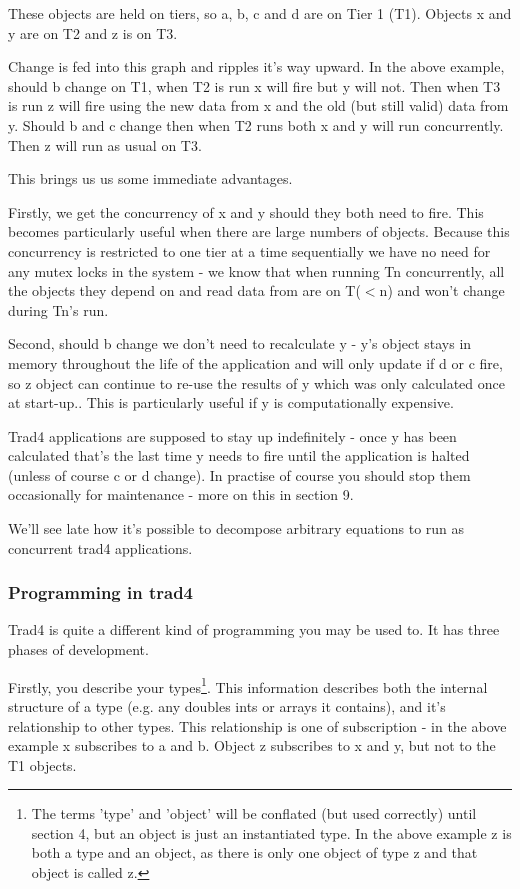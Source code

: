 \documentclass{report}
\begin{document}
These objects are held on tiers, so a, b, c and d are on Tier 1 (T1). Objects x and y are on T2 and z is on T3. 

Change is fed into this graph and ripples it's way upward. In the above example, should b change on T1, when T2 is run x will fire but y will not. Then when T3 is run z will fire using the new data from x and the old (but still valid) data from y. Should b and c change then when T2 runs both x and  y will run concurrently. Then z will run as usual on T3.

This brings us us some immediate advantages. 

Firstly, we get the concurrency of x and y should they both need to fire. This becomes particularly useful when there are large numbers of objects. Because this concurrency is restricted to one tier at a time sequentially we have no need for any mutex locks in the system - we know that when running Tn concurrently, all the objects they depend on and read data from are on T($<$n) and won't change during Tn's run.

Second, should b change we don't need to recalculate y - y's object stays in memory throughout the life of the application and will only update if d or c fire, so z object can continue to re-use the results of y which was only calculated once at start-up.. This is particularly useful if y is computationally expensive.

Trad4 applications are supposed to stay up indefinitely - once y has been calculated that's the last time y needs to fire until the application is halted (unless of course c or d change). In practise of course you should stop them occasionally for maintenance - more on this in section 9.

We'll see late how it's possible to decompose arbitrary equations to run as concurrent trad4 applications.

\subsubsection{Programming in trad4}

Trad4 is quite a different kind of programming you may be used to. It has three phases of development.

Firstly, you describe your types\footnote{The terms 'type' and 'object' will be conflated (but used correctly) until section 4, but an object is just an instantiated type. In the above example z is both a type and an object, as there is only one object of type z and that object is called z.}. This information describes both the internal structure of a type (e.g. any doubles ints or arrays it contains), and it's relationship to other types. This relationship is one of subscription - in the above example x subscribes to a and b. Object z subscribes to x and y, but not to the T1 objects.
\end{document}
